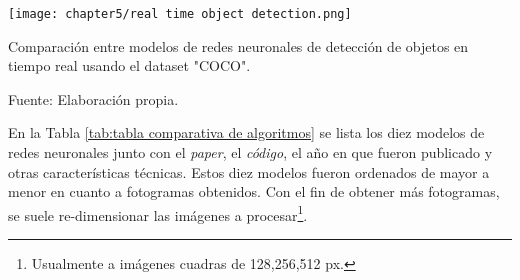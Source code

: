 \begin{myfigure}[H]
	\footnotesize\centering
	\texttt{[image: chapter5/real time object detection.png]}
	\caption{Comparación entre modelos de redes neuronales de detección de objetos en tiempo real usando el dataset "COCO".}
	\begin{myflushcenter}
		Fuente: Elaboración propia.
	\end{myflushcenter}
	\label{fig:real time object detection}
\end{myfigure}

En la Tabla \ref{tab:tabla comparativa de algoritmos} se lista los diez modelos de redes neuronales junto con el \textit{paper}, el \textit{código}, el año en que fueron publicado y otras características técnicas. Estos diez modelos fueron ordenados de mayor a menor en cuanto a fotogramas obtenidos. Con el fin de obtener más fotogramas, se suele re-dimensionar las imágenes a procesar\footnote{Usualmente a imágenes cuadras de  128,256,512 px.}.

